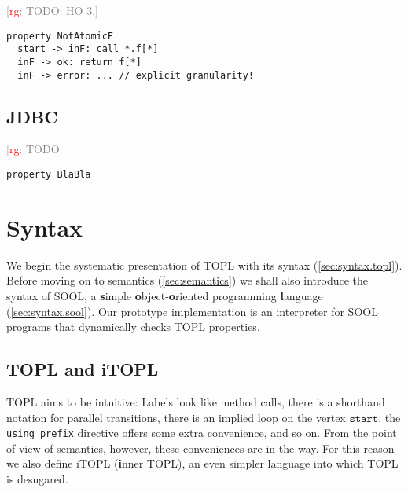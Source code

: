 \documentclass[preprint]{sigplanconf} %
\newcommand{\note}[2]{\textcolor{gray}{[\textcolor{red}{#1}: #2]}}
\newcommand{\rg}[1]{\note{rg}{#1}}
\newcommand{\start}{\ensuremath{\mathtt{start}}\xspace}
\theoremstyle{definition}
\theoremstyle{remark}
\begin{document}
\rg{TODO: HO 3.}
\par\medskip\noindent
\begin{Verbatim}
property NotAtomicF
  start -> inF: call *.f[*]
  inF -> ok: return f[*]
  inF -> error: ... // explicit granularity!
\end{Verbatim}

\subsection{JDBC} \label{sec:examples.jdbc} %

\rg{TODO}
\par\medskip\noindent
\begin{Verbatim}
property BlaBla
\end{Verbatim}

\section{Syntax}\label{sec:syntax} %

We begin the systematic presentation of TOPL with its syntax (\autoref{sec:syntax.topl}).
Before moving on to semantics (\autoref{sec:semantics}) we shall also introduce the syntax of SOOL, a \textbf simple \textbf object-\textbf oriented programming \textbf language (\autoref{sec:syntax.sool}).
Our prototype implementation is an interpreter for SOOL programs that dynamically checks TOPL properties.

\subsection{TOPL and iTOPL}\label{sec:syntax.topl} %


TOPL aims to be intuitive:
Labels look like method calls, there is a shorthand notation for parallel transitions, there is an implied loop on the vertex \start, the \texttt{using prefix} directive offers some extra convenience, and so on.
From the point of view of semantics, however, these conveniences are in the way.
For this reason we also define iTOPL (\textbf inner TOPL), an even simpler language into which TOPL is desugared.
\end{document}
